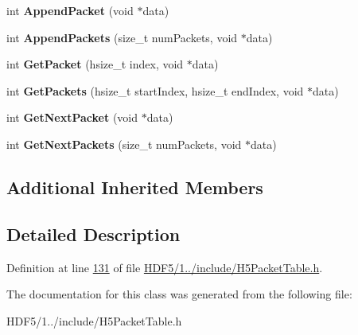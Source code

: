 \begin{DoxyCompactItemize}
int {\bfseries Append\+Packet} (void $\ast$data)
\item 
\mbox{\label{class_f_l___packet_table_a612444103e6a13a2ad68e9a25a7a2b87}} 
int {\bfseries Append\+Packets} (size\+\_\+t num\+Packets, void $\ast$data)
\item 
\mbox{\label{class_f_l___packet_table_aa5f3c5343b5f48130995102d559e049f}} 
int {\bfseries Get\+Packet} (hsize\+\_\+t index, void $\ast$data)
\item 
\mbox{\label{class_f_l___packet_table_ad2014dca0fc515832b753fcc0451a375}} 
int {\bfseries Get\+Packets} (hsize\+\_\+t start\+Index, hsize\+\_\+t end\+Index, void $\ast$data)
\item 
\mbox{\label{class_f_l___packet_table_ab626730cc9e44f44160ce31af3b714aa}} 
int {\bfseries Get\+Next\+Packet} (void $\ast$data)
\item 
\mbox{\label{class_f_l___packet_table_ad4467800cdc82cf554dca12b8bc87db7}} 
int {\bfseries Get\+Next\+Packets} (size\+\_\+t num\+Packets, void $\ast$data)
\end{DoxyCompactItemize}
\subsection*{Additional Inherited Members}


\subsection{Detailed Description}


Definition at line \hyperlink{_h_d_f5_21_810_81_2include_2_h5_packet_table_8h_source_l00131}{131} of file \hyperlink{_h_d_f5_21_810_81_2include_2_h5_packet_table_8h_source}{H\+D\+F5/1../include/\+H5\+Packet\+Table.\+h}.



The documentation for this class was generated from the following file\+:\begin{DoxyCompactItemize}
\item 
H\+D\+F5/1../include/\+H5\+Packet\+Table.\+h\end{DoxyCompactItemize}
